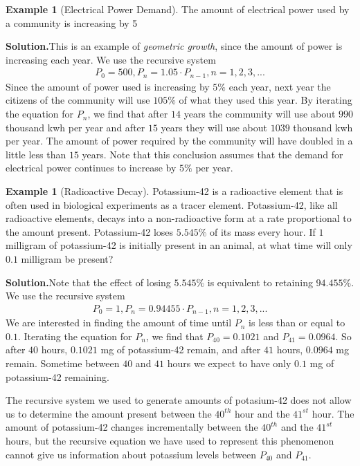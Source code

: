 \documentclass[10pt,]{book}
\theoremstyle{plain}
\theoremstyle{definition}
\theoremstyle{definition}
\newtheorem{example}[theorem]{Example}
\theoremstyle{definition}
\numberwithin{equation}{section}
\begin{document}
\begin{example}[Electrical Power Demand]\label{example-electrical-power-demand}
The amount of electrical power used by a community is increasing by 5%
\par\medskip\noindent%
\textbf{Solution.}\quad This is an example of \emph{geometric growth}, since the amount of power is increasing each year. We use the recursive system%
%
\begin{gather*}
P_0=500, P_n=1.05 \cdot P_{n-1}, n=1,2,3,...
\end{gather*}
Since the amount of power used is increasing by \(5\%\) each year, next year the citizens of the community will use \(105\%\) of what they used this year.  By iterating the equation for \(P_n\), we find that after \(14\) years the community will use about \(990\) thousand kwh per year and after \(15\) years they will use about \(1039\) thousand kwh per year.  The amount of power required by the community will have doubled in a little less than \(15\) years.  Note that this conclusion assumes that the demand for electrical power continues to increase by \(5\%\) per year.%
\end{example}
\begin{example}[Radioactive Decay]\label{example-radioactive-decay}
Potassium-42 is a radioactive element that is often used in biological experiments as a tracer element.  Potassium-42, like all radioactive elements, decays into a non-radioactive form at a rate proportional to the amount present.  Potassium-42 loses \(5.545\%\) of its mass every hour.  If \(1\) milligram of potassium-42 is initially present in an animal, at what time will only \(0.1\) milligram be present?%
\par\medskip\noindent%
\textbf{Solution.}\quad Note that the effect of losing \(5.545\%\) is equivalent to retaining \(94.455\%\). We use the recursive system%
%
\begin{gather*}
P_0=1, P_n=0.94455 \cdot P_{n-1}, n=1,2,3,...
\end{gather*}
We are interested in finding the amount of time until \(P_n\) is less than or equal to \(0.1\).  Iterating the equation for \(P_n\), we find that \(P_{40} = 0.1021\) and \(P_{41} = 0.0964\). So after \(40\) hours, \(0.1021\) mg of potassium-42 remain, and after \(41\) hours, \(0.0964\) mg remain. Sometime between \(40\) and \(41\) hours we expect to have only \(0.1\) mg of potassium-42 remaining.%
\par
The recursive system we used to generate amounts of potasium-42 does not allow us to determine the amount present between the \(40^{th}\) hour and the \(41^{st}\) hour.  The amount of potassium-42 changes incrementally between the \(40^{th}\) and the \(41^{st}\) hours, but the recursive equation we have used to represent this phenomenon cannot give us information about potassium levels between \(P_{40}\) and \(P_{41}\).%
\end{example}
\end{document}
